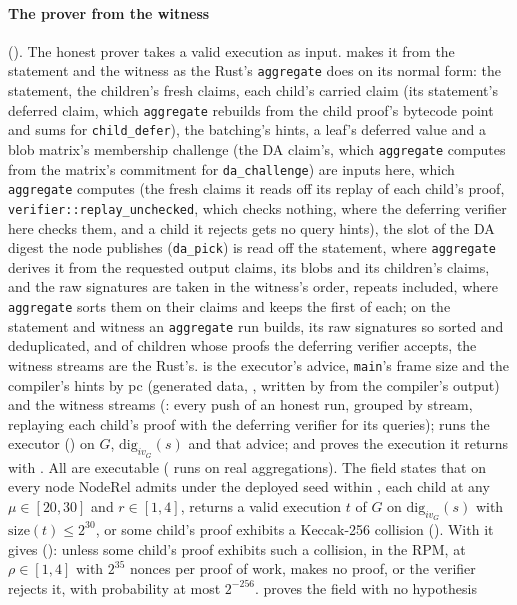 \documentclass[11pt]{article}
\begin{document}
\paragraph{The prover from the witness} (). The honest prover  takes a valid execution as input.  makes it from the statement and the witness as the Rust's \texttt{aggregate} does on its normal form: the statement, the children's fresh claims, each child's carried claim (its statement's deferred claim, which \texttt{aggregate} rebuilds from the child proof's bytecode point and sums for \texttt{child\_defer}), the batching's hints, a leaf's deferred value and a blob matrix's membership challenge (the DA claim's, which \texttt{aggregate} computes from the matrix's commitment for \texttt{da\_challenge}) are inputs here, which \texttt{aggregate} computes (the fresh claims it reads off its replay of each child's proof, \texttt{verifier::replay\_unchecked}, which checks nothing, where the deferring verifier here checks them, and a child it rejects gets no query hints), the slot of the DA digest the node publishes (\texttt{da\_pick}) is read off the statement, where \texttt{aggregate} derives it from the requested output claims, its blobs and its children's claims, and the raw signatures are taken in the witness's order, repeats included, where \texttt{aggregate} sorts them on their claims and keeps the first of each; on the statement and witness an \texttt{aggregate} run builds, its raw signatures so sorted and deduplicated, and of children whose proofs the deferring verifier accepts, the witness streams are the Rust's.  is the executor's advice, \texttt{main}'s frame size and the compiler's hints by pc (generated data, , written by  from the compiler's output) and the witness streams (: every push of an honest run, grouped by stream, replaying each child's proof with the deferring verifier for its queries);  runs the executor  () on $G$, $\mathrm{dig}_{iv_G}(s)$ and that advice; and  proves the execution it returns with . All are executable ( runs  on real aggregations). The field  states that on every node $\mathrm{NodeRel}$ admits under the deployed seed within , each child at any $\mu \in [20,30]$ and $r \in [1,4]$,  returns a valid execution $t$ of $G$ on $\mathrm{dig}_{iv_G}(s)$ with $\mathrm{size}(t) \le 2^{30}$, or some child's proof exhibits a Keccak-256 collision (). With  it gives  (): unless some child's proof exhibits such a collision, in the RPM, at $\rho \in [1,4]$ with $2^{35}$ nonces per proof of work,  makes no proof, or the verifier rejects it, with probability at most $2^{-256}$.  proves the field with no hypothesis 
\end{document}
